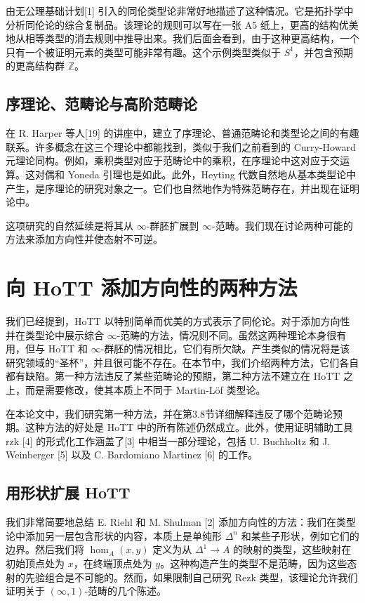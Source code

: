 \documentclass{ctexrep}
\theoremstyle{plain}
\theoremstyle{definition}
\theoremstyle{remark}
\theoremstyle{definition}
\theoremstyle{definition}
\theoremstyle{definition}
\begin{document}
由无公理基础计划[1] 引入的同伦类型论非常好地描述了这种情况。它是拓扑学中分析同伦论的综合复制品。该理论的规则可以写在一张 A5 纸上，更高的结构优美地从相等类型的消去规则中推导出来。我们后面会看到，由于这种更高结构，一个只有一个被证明元素的类型可能非常有趣。这个示例类型类似于 $S^{1}$，并包含预期的更高结构群 $\mathbb{Z}$。

\subsection{序理论、范畴论与高阶范畴论}

在 R. Harper 等人[19] 的讲座中，建立了序理论、普通范畴论和类型论之间的有趣联系。许多概念在这三个理论中都能找到，类似于我们之前看到的 Curry-Howard 元理论同构。例如，乘积类型对应于范畴论中的乘积，在序理论中这对应于交运算。这对偶和 Yoneda 引理也是如此。此外，Heyting 代数自然地从基本类型论中产生，是序理论的研究对象之一。它们也自然地作为特殊范畴存在，并出现在证明论中。

这项研究的自然延续是将其从 $\infty$-群胚扩展到 $\infty$-范畴。我们现在讨论两种可能的方法来添加方向性并使态射不可逆。

\section{向 HoTT 添加方向性的两种方法}

我们已经提到，HoTT 以特别简单而优美的方式表示了同伦论。对于添加方向性并在类型论中展示综合 $\infty$-范畴的方法，情况则不同。虽然这两种理论本身很有用，但与 HoTT 和 $\infty$-群胚的情况相比，它们有所欠缺。产生类似的情况将是该研究领域的“圣杯”，并且很可能不存在。在本节中，我们介绍两种方法，它们各自都有缺陷。第一种方法违反了某些范畴论的预期，第二种方法不建立在 HoTT 之上，而是需要修改，使其本质上不同于 Martin-Löf 类型论。

在本论文中，我们研究第一种方法，并在第3.8节详细解释违反了哪个范畴论预期。这种方法的好处是 HoTT 中的所有陈述仍然成立。此外，使用证明辅助工具 \textsf{rzk} [4] 的形式化工作涵盖了[3] 中相当一部分理论，包括 U. Buchholtz 和 J. Weinberger [5] 以及 C. Bardomiano Martinez [6] 的工作。

\subsection{用形状扩展 HoTT}

我们非常简要地总结 E. Riehl 和 M. Shulman [2] 添加方向性的方法：我们在类型论中添加另一层包含形状的内容，本质上是单纯形 $\Delta^n$ 和某些子形状，例如它们的边界。然后我们将 $\hom_{A}(x,y)$ 定义为从 $\Delta^{1}\to A$ 的映射的类型，这些映射在初始顶点处为 $x$，在终端顶点处为 $y$。这种构造产生的类型不是范畴，因为这些态射的先验组合是不可能的。然而，如果限制自己研究 Rezk 类型，该理论允许我们证明关于 $(\infty,1)$-范畴的几个陈述。
\end{document}
